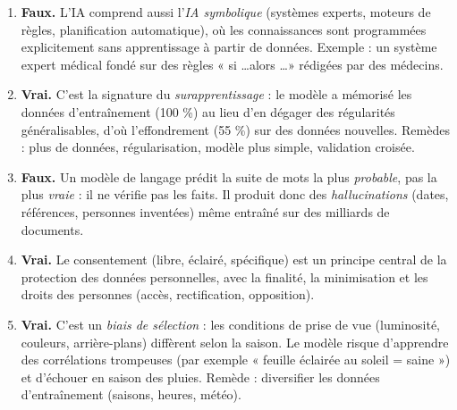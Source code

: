 \documentclass[11pt]{article}
\begin{document}
\begin{corrige}
\begin{enumerate}
\item \textbf{Faux.} L'IA comprend aussi l'\emph{IA symbolique} (systèmes experts, moteurs de règles, planification automatique), où les connaissances sont programmées explicitement sans apprentissage à partir de données. Exemple : un système expert médical fondé sur des règles « si \ldots alors \ldots » rédigées par des médecins.
\item \textbf{Vrai.} C'est la signature du \emph{surapprentissage} : le modèle a mémorisé les données d'entraînement (100 \%) au lieu d'en dégager des régularités généralisables, d'où l'effondrement (55 \%) sur des données nouvelles. Remèdes : plus de données, régularisation, modèle plus simple, validation croisée.
\item \textbf{Faux.} Un modèle de langage prédit la suite de mots la plus \emph{probable}, pas la plus \emph{vraie} : il ne vérifie pas les faits. Il produit donc des \emph{hallucinations} (dates, références, personnes inventées) même entraîné sur des milliards de documents.
\item \textbf{Vrai.} Le consentement (libre, éclairé, spécifique) est un principe central de la protection des données personnelles, avec la finalité, la minimisation et les droits des personnes (accès, rectification, opposition).
\item \textbf{Vrai.} C'est un \emph{biais de sélection} : les conditions de prise de vue (luminosité, couleurs, arrière-plans) diffèrent selon la saison. Le modèle risque d'apprendre des corrélations trompeuses (par exemple « feuille éclairée au soleil = saine ») et d'échouer en saison des pluies. Remède : diversifier les données d'entraînement (saisons, heures, météo).
\end{enumerate}
\end{corrige}
\end{document}
